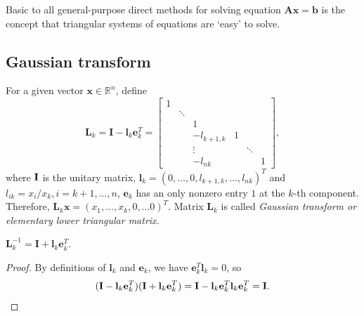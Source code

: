 \begin{prop}
    Basic to all general-purpose direct methods for 
    solving equation $\mathbf{Ax=b}$ is the
    concept that triangular systems of equations are 
    ‘easy’ to solve.
\end{prop}

\subsection{Gaussian transform}
\begin{defn}
    \label{defn::GaussTransform}
    For a given vector $\mathbf{x}\in\mathbb{R}^n$, define
    $$
        \mathbf{L}_k=\mathbf{I}-\mathbf{l}_k
        \mathbf{e}_k^T=
        \begin{bmatrix}
            1&\\
             &\ddots\\
             &      &1\\
             &      &-l_{k+1,k}&1\\
             &      &\vdots    &&\ddots\\
             &      &-l_{nk}  &&      &1
        \end{bmatrix},
    $$ 
    where ${\mathbf{I}}$ is the unitary matrix, $\mathbf{l}_k=(0,\ldots,0,l_{k+1,k},\ldots,l_{nk})^T$ and $l_{ik}=x_i/x_k,
    i=k+1,\ldots,n$, 
    $\mathbf{e}_k$ has an only nonzero entry $1$ at the 
    $k$-th component. Therefore, $\mathbf{L}_k\mathbf{x}=
    (x_1,\ldots,x_k,0,\ldots0)^T$. Matrix $\mathbf{L}_k$ is
    called \it{Gaussian transform} or \textit{elementary lower 
    triangular} matrix.
\end{defn}

\begin{lem}
    \label{lem::GaussInverse}
    $\mathbf{L}_k^{-1}=\mathbf{I}+\mathbf{l}_k\mathbf{e}_k^T$.
\end{lem}
\begin{proof}
    By definitions of $\mathbf{l}_k$ and $\mathbf{e}_k$, we have
    $\mathbf{e}_k^T\mathbf{l}_k=0$, so
    $$
        (\mathbf{I}-\mathbf{l}_k{\mathbf{e}}_k^T)({\mathbf{I}}+{\mathbf{l}}_k{\mathbf{e}}_k^T)=
        {\mathbf{I}}-{\mathbf{l}}_k{\mathbf{e}}_k^T{\mathbf{l}}_k{\mathbf{e}}_k^T={\mathbf{I}}.
    $$ 
\end{proof}


